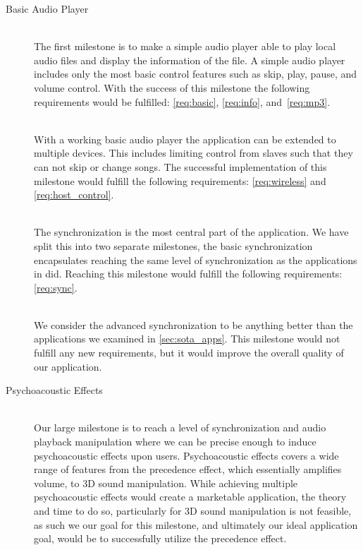 \begin{description}
    \item [Basic Audio Player] \hfill \\
        The first milestone is to make a simple audio player able to play local audio files and display the information of the file.
        A simple audio player includes only the most basic control features such as skip, play, pause, and volume control.
        With the success of this milestone the following requirements would be fulfilled: \ref{req:basic}, \ref{req:info}, and~\ref{req:mp3}.
    \item [] \hfill \\
        With a working basic audio player the application can be extended to multiple devices.
        This includes limiting control from slaves such that they can not skip or change songs.
        The successful implementation of this milestone would fulfill the following requirements: \ref{req:wireless} and \ref{req:host_control}.
    \item [] \hfill \\
        The synchronization is the most central part of the application. We have split this into two separate milestones, the basic synchronization encapsulates reaching the same level of synchronization as the applications in  did.
        Reaching this milestone would fulfill the following requirements: \ref{req:sync}.
    \item [] \hfill \\
        We consider the advanced synchronization to be anything better than the applications we examined in \cref{sec:sota_apps}.
        This milestone would not fulfill any new requirements, but it would improve the overall quality of our application.
    \item [Psychoacoustic Effects] \hfill \\
        Our large milestone is to reach a level of synchronization and audio playback manipulation where we can be precise enough to induce psychoacoustic effects upon users.
        Psychoacoustic effects covers a wide range of features from the precedence effect, which essentially amplifies volume, to 3D sound manipulation.
        While achieving multiple psychoacoustic effects would create a marketable application, the theory and time to do so, particularly for 3D sound manipulation is not feasible, as such we our goal for this milestone, and ultimately our ideal application goal, would be to successfully utilize the precedence effect.

\end{description}
